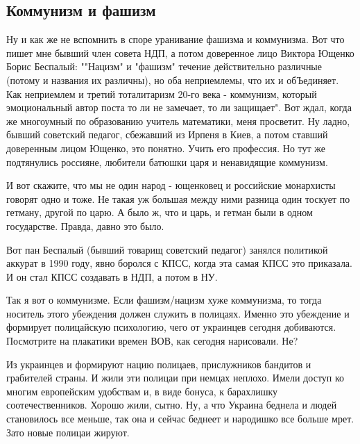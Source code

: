  
 
 

\subsection{Коммунизм и фашизм}
\label{sec:30_10_2020.fb.denis_zharkih.2.kommunizm}


Ну и как же не вспомнить в споре уранивание фашизма и коммунизма. Вот что пишет
мне бывший член совета НДП, а потом доверенное лицо Виктора Ющенко Борис
Беспалый: ""Нацизм" и "фашизм" течение действительно различные (потому и
названия их различны), но оба неприемлемы, что их и обЪединяет. Как неприемлем
и третий тоталитаризм 20-го века - коммунизм, который эмоциональный автор поста
то ли не замечает, то ли защищает". Вот ждал, когда же многоумный по
образованию учитель математики, меня просветит. Ну ладно, бывший советский
педагог, сбежавший из Ирпеня в Киев, а потом ставший доверенным лицом Ющенко,
это понятно. Учить его профессия. Но тут же подтянулись россияне, любители
батюшки царя и ненавидящие коммунизм. 

И вот скажите, что мы не один народ - ющенковец и российские монархисты говорят
одно и тоже. Не такая уж большая между ними разница один тоскует по гетману,
другой по царю. А было ж, что и царь, и гетман были в одном государстве.
Правда, давно это было. 

Вот пан Беспалый (бывший товарищ советский педагог) занялся политикой аккурат в
1990 году, явно боролся с КПСС, когда эта самая КПСС это приказала. И он стал
КПСС создавать в НДП, а потом в НУ.  

Так я вот о коммунизме. Если фашизм/нацизм хуже коммунизма, то тогда носитель этого убеждения должен служить в полицаях. Именно это убеждение и формирует полицайскую психологию, чего от украинцев сегодня добиваются. Посмотрите на плакатики времен ВОВ, как сегодня нарисовали. Не? 

Из украинцев и формируют нацию полицаев, прислужников бандитов и грабителей
страны. И жили эти полицаи при немцах неплохо. Имели доступ ко многим
европейским удобствам и, в виде бонуса, к барахлишку соотечественников. Хорошо
жили, сытно. Ну, а что Украина беднела и людей становилось все меньше, так она
и сейчас беднеет и народишко все больше мрет. Зато новые полицаи жируют. 

